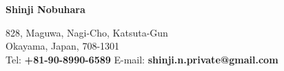 \begin{center}
    \begin{large}
       \textbf{Shinji Nobuhara}\\
    \end{large}
    828, Maguwa, Nagi-Cho, Katsuta-Gun \\
    Okayama, Japan, 708-1301 \\
    Tel: \textbf{+81-90-8990-6589} \hfill E-mail: \textbf{shinji.n.private@gmail.com} \\
\end{center}
